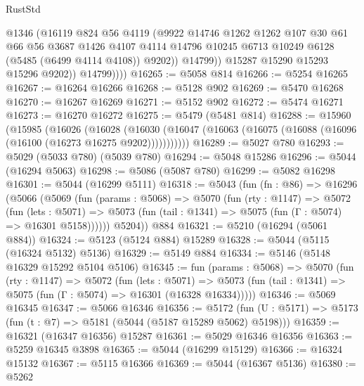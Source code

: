 \begin{lexlean}{RustStd}
\begin{coremodule}
                    @1346
                    (@16119
                      @824
                      @56
                      @4119
                      (@9922
                        @14746
                        @1262
                        @1262
                        @107
                        @30
                        @61
                        @66
                        @56
                        @3687
                        @1426
                        @4107
                        @4114
                        @14796
                        @10245
                        @6713
                        @10249
                        @6128
                        (@5485 (@6499 @4114 @4108))
                        @9202))
                    @14799))
                @15287
                @15290
                @15293
                @15296
                @9202))
            @14799))))
@16265 := @5058 @814
@16266 := @5254 @16265
@16267 := @16264 @16266
@16268 := @5128 @902
@16269 := @5470 @16268
@16270 := @16267 @16269
@16271 := @5152 @902
@16272 := @5474 @16271
@16273 := @16270 @16272
@16275 := @5479 (@5481 @814)
@16288 := @15960
    (@15985
      (@16026
        (@16028
          (@16030 (@16047 (@16063 (@16075 (@16088 (@16096 (@16100 (@16273 @16275 @9202)))))))))))
@16289 := @5027 @780
@16293 := @5029 (@5033 @780) (@5039 @780)
@16294 := @5048 @15286
@16296 := @5044 (@16294 @5063)
@16298 := @5086 (@5087 @780)
@16299 := @5082 @16298
@16301 := @5044 (@16299 @5111)
@16318 := @5043
    (fun (fn : @86) =>
    @16296
      (@5066
        (@5069
          (fun (params : @5068) =>
          @5070
            (fun (rty : @1147) =>
            @5072
              (fun (lets : @5071) =>
              @5073 (fun (tail : @1341) => @5075 (fun (Γ : @5074) => @16301 @5158))))))
        @5204))
    @884
@16321 := @5210 (@16294 (@5061 @884))
@16324 := @5123 (@5124 @884) @15289
@16328 := @5044 (@5115 (@16324 @5132) @5136)
@16329 := @5149 @884
@16334 := @5146 (@5148 @16329 @15292 @5104 @5106)
@16345 := fun (params : @5068) =>
  @5070
    (fun (rty : @1147) =>
    @5072
      (fun (lets : @5071) =>
      @5073 (fun (tail : @1341) => @5075 (fun (Γ : @5074) => @16301 (@16328 @16334)))))
@16346 := @5069 @16345
@16347 := @5066 @16346
@16356 := @5172
    (fun (U : @5171) => @5173 (fun (t : @7) => @5181 (@5044 (@5187 @15289 @5062) @5198)))
@16359 := @16321 (@16347 @16356) @15287
@16361 := @5029 @16346 @16356
@16363 := @5259 @16345 @3898
@16365 := @5044 (@16299 @15129)
@16366 := @16324 @15132
@16367 := @5115 @16366
@16369 := @5044 (@16367 @5136)
@16380 := @5262

\end{coremodule}
\end{lexlean}
